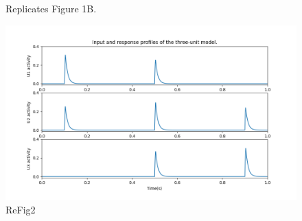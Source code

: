 \begin{figure}
 \caption{Replicates Figure 1B.}
 \label{fig:figure1B}
\end{figure}


\begin{figure}
 \includegraphics[width=\textwidth]{Figures/Fig2}
 \caption{ReFig2}
\end{figure}

